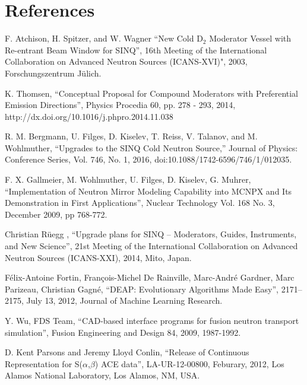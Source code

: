 \documentclass[a4paper]{jpconf}
\begin{document}

\section*{References}
\begin{thebibliography}{9}


		F. Atchison, H. Spitzer, and W. Wagner 
		``New Cold {D$_2$} Moderator Vessel with Re-entrant Beam Window for {SINQ}'',
		16th Meeting of the International Collaboration on Advanced Neutron Sources (ICANS-XVI)", 2003, Forschungszentrum J{\"u}lich.

		K. Thomsen,
		``Conceptual Proposal for Compound Moderators with Preferential Emission Directions'',
		Physics Procedia 60, pp. 278 - 293, 2014, http://dx.doi.org/10.1016/j.phpro.2014.11.038

		R. M. Bergmann, U. Filges, D. Kiselev, T. Reiss, V. Talanov, and M. Wohlmuther, 
		``Upgrades to the SINQ Cold Neutron Source,'' 
		Journal of Physics: Conference Series, Vol. 746, No. 1, 2016, doi:10.1088/1742-6596/746/1/012035.

	     F. X. Gallmeier, M. Wohlmuther, U. Filges, D. Kiselev, G. Muhrer,
	     ``Implementation of Neutron Mirror Modeling Capability into MCNPX and Its Demonstration in First Applications'',
	     Nuclear Technology Vol. 168 No. 3, December 2009, pp 768-772. 

		Christian R{\"u}egg ,
		``Upgrade plans for {SINQ} -- Moderators, Guides, Instruments, and New Science'',
		 21st Meeting of the International Collaboration on Advanced Neutron Sources (ICANS-XXI), 2014, Mito, Japan.

	     F\'elix-Antoine Fortin, Fran\c{c}ois-Michel {De Rainville}, Marc-Andr\'e Gardner, Marc Parizeau, Christian Gagn\'e,
	     ``{DEAP}: Evolutionary Algorithms Made Easy'', 2171--2175, July 13, 2012, Journal of Machine Learning Research. 

	     Y. Wu, FDS Team, 
	     ``CAD-based interface programs for fusion neutron transport simulation'', 
	     Fusion Engineering and Design 84, 2009, 1987-1992.

		 D. Kent Parsons and Jeremy Lloyd Conlin, 
		``Release of Continuous Representation for S($\alpha$,$\beta$) ACE data'', 
		LA-UR-12-00800, Feburary, 2012, Los Alamos National Laboratory,	Los Alamos, NM, USA.
	   

\end{thebibliography}
\end{document}
